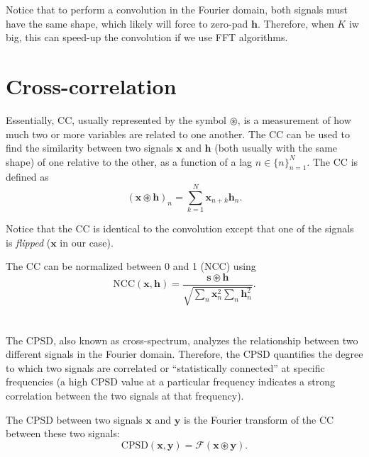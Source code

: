 Notice that to perform a convolution in the Fourier domain, both
signals must have the same shape, which likely will force to zero-pad
$\mathbf{h}$. Therefore, when $K$ iw big, this can speed-up the
convolution if we use \gls{FFT} algorithms.


\section{Cross-correlation}
\label{sec:cross-correlation}

Essentially, \gls{CC}, usually represented by the symbol
$\circledast$, is a measurement of how much two or more variables are
related to one another. The \gls{CC} can be used to find the
similarity between two signals $\mathbf{x}$ and $\mathbf{h}$ (both
usually with the same shape) of one relative to the other, as a
function of a lag $n\in\{n\}_{n=1}^{N}$. The \gls{CC} is
defined as
\begin{equation}
  (\mathbf{x}\circledast\mathbf{h})_n=\sum_{k=1}^{N}{\mathbf{x}}_{n+k} \mathbf{h}_n.
  \label{eq:cross-correlation}
\end{equation}

Notice that the \gls{CC} is identical to the convolution except that
one of the signals is \emph{flipped} ($\mathbf{x}$ in our case).

The \gls{CC} can be normalized between 0 and 1 (\gls{NCC}) using
\begin{equation}
  \text{NCC}(\mathbf{x},\mathbf{h})=\frac{{\mathbf{s}\circledast\mathbf{h}}}{\sqrt{\sum_n \mathbf{x}_n^2 \sum_n \mathbf{h}_n^2}}.
\end{equation}


\section{}
\label{sec:CPSD}

The \acrshort{CPSD}, also known as cross-spectrum, analyzes the
relationship between two different signals in the Fourier
domain. Therefore, the \gls{CPSD} quantifies the degree to which two
signals are correlated or ``statistically connected'' at specific
frequencies (a high \gls{CPSD} value at a particular frequency
indicates a strong correlation between the two signals at that
frequency).

The \gls{CPSD} between two signals $\mathbf{x}$ and $\mathbf{y}$ is
the Fourier transform of the \gls{CC} between these two
signals:
\begin{equation}
  \text{CPSD}(\mathbf{x},\mathbf{y})=\mathcal{F}({\mathbf{x}\circledast\mathbf{y}}).
\end{equation}

